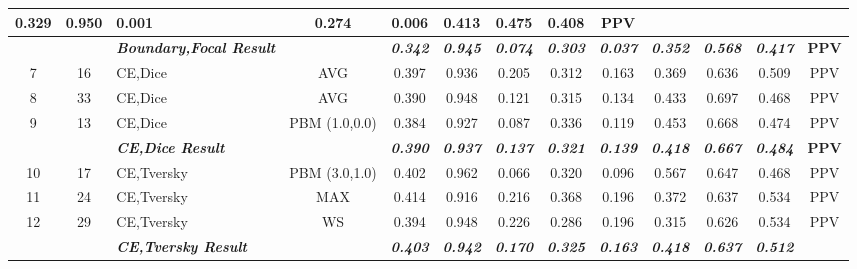\begin{table}[H]
{\begin{tabular}{cc|l|c|c|c|c|c|c|c|c|c|c|}
    0.329 &
    0.950 &
    0.001 &
    0.274 &
    0.006 &
    0.413 &
    0.475 &
    0.408 &
    PPV \\ \hline
  \textbf{} &
    \textit{\textbf{}} &
    \textit{\textbf{Boundary,Focal Result}} &
    \textbf{} &
    \textit{\textbf{0.342}} &
    \textit{\textbf{0.945}} &
    \textit{\textbf{0.074}} &
    \textit{\textbf{0.303}} &
    \textit{\textbf{0.037}} &
    \textit{\textbf{0.352}} &
    \textit{\textbf{0.568}} &
    \textit{\textbf{0.417}} &
    \textbf{PPV} \\ \hline
  \multicolumn{1}{|c|}{7} &
    16 &
    CE,Dice &
    AVG &
    0.397 &
    0.936 &
    0.205 &
    0.312 &
    0.163 &
    0.369 &
    0.636 &
    0.509 &
    PPV \\ \hline
  \multicolumn{1}{|c|}{8} &
    33 &
    CE,Dice &
    AVG &
    0.390 &
    0.948 &
    0.121 &
    0.315 &
    0.134 &
    0.433 &
    0.697 &
    0.468 &
    PPV \\ \hline
  \multicolumn{1}{|c|}{9} &
    13 &
    CE,Dice &
    PBM (1.0,0.0) &
    0.384 &
    0.927 &
    0.087 &
    0.336 &
    0.119 &
    0.453 &
    0.668 &
    0.474 &
    PPV \\ \hline
  \textbf{} &
    \textit{\textbf{}} &
    \textit{\textbf{CE,Dice Result}} &
    \textbf{} &
    \textit{\textbf{0.390}} &
    \textit{\textbf{0.937}} &
    \textit{\textbf{0.137}} &
    \textit{\textbf{0.321}} &
    \textit{\textbf{0.139}} &
    \textit{\textbf{0.418}} &
    \textit{\textbf{0.667}} &
    \textit{\textbf{0.484}} &
    \textbf{PPV} \\ \hline
  \multicolumn{1}{|c|}{10} &
    17 &
    CE,Tversky &
    PBM (3.0,1.0) &
    0.402 &
    0.962 &
    0.066 &
    0.320 &
    0.096 &
    0.567 &
    0.647 &
    0.468 &
    PPV \\ \hline
  \multicolumn{1}{|c|}{11} &
    24 &
    CE,Tversky &
    MAX &
    0.414 &
    0.916 &
    0.216 &
    0.368 &
    0.196 &
    0.372 &
    0.637 &
    0.534 &
    PPV \\ \hline
  \multicolumn{1}{|c|}{12} &
    29 &
    CE,Tversky &
    WS &
    0.394 &
    0.948 &
    0.226 &
    0.286 &
    0.196 &
    0.315 &
    0.626 &
    0.534 &
    PPV \\ \hline
  \textbf{} &
    \textit{\textbf{}} &
    \textit{\textbf{CE,Tversky Result}} &
    \textbf{} &
    \textit{\textbf{0.403}} &
    \textit{\textbf{0.942}} &
    \textit{\textbf{0.170}} &
    \textit{\textbf{0.325}} &
    \textit{\textbf{0.163}} &
    \textit{\textbf{0.418}} &
    \textit{\textbf{0.637}} &
    \textit{\textbf{0.512}} &

\end{tabular}}
\end{table}
